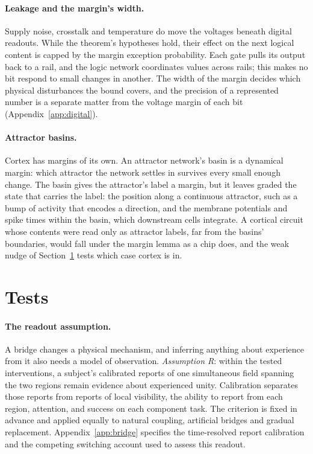 \documentclass[12pt]{article}
\begin{document}
\paragraph{Leakage and the margin's width.} Supply noise, crosstalk and
temperature do move the voltages beneath digital readouts. While the theorem's
hypotheses hold, their effect on the next logical content is capped by the
margin exception probability. Each gate pulls its output back to a rail, and
the logic network coordinates values across rails; this makes no bit respond to
small changes in another. The width of the margin decides which physical
disturbances the bound covers, and the precision of a represented number is a
separate matter from the voltage margin of each bit
(Appendix~\ref{app:digital}).

\paragraph{Attractor basins.} Cortex has margins of its own. An attractor
network's basin is a dynamical margin: which attractor the network settles in
survives every small enough change. The basin gives the attractor's label a
margin, but it leaves graded the state that carries the label: the position along
a continuous attractor, such as a bump of activity that encodes a direction, and
the membrane potentials and spike times within the basin, which downstream cells
integrate. A cortical circuit whose contents were read only as attractor labels,
far from the basins' boundaries, would fall under the margin lemma as a chip
does, and the weak nudge of Section~\ref{sec:tests} tests which case cortex is
in.

\section{Tests}
\label{sec:tests}

\paragraph{The readout assumption.} A bridge changes a physical mechanism, and
inferring anything about experience from it also needs a model of observation.
\emph{Assumption R}: within the tested interventions, a subject's calibrated
reports of one simultaneous field spanning the two regions remain evidence
about experienced unity. Calibration separates those reports from reports of
local visibility, the ability to report from each region, attention, and
success on each component task. The criterion is fixed in advance and applied
equally to natural coupling, artificial bridges and gradual replacement.
Appendix~\ref{app:bridge} specifies the time-resolved report calibration and
the competing switching account used to assess this readout.
\end{document}
